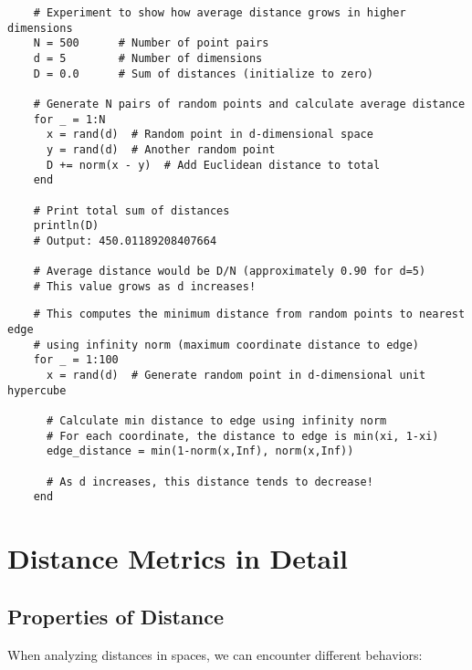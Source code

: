 \begin{tcolorbox}[width=\textwidth, left=-6mm, sharp corners, boxrule=0pt, title=\textbf{Experiment: Average distance in high dimensions}]
  \begin{verbatim}
    # Experiment to show how average distance grows in higher dimensions
    N = 500      # Number of point pairs
    d = 5        # Number of dimensions
    D = 0.0      # Sum of distances (initialize to zero)

    # Generate N pairs of random points and calculate average distance
    for _ = 1:N
      x = rand(d)  # Random point in d-dimensional space
      y = rand(d)  # Another random point
      D += norm(x - y)  # Add Euclidean distance to total
    end

    # Print total sum of distances
    println(D)
    # Output: 450.01189208407664

    # Average distance would be D/N (approximately 0.90 for d=5)
    # This value grows as d increases!
  \end{verbatim}
\end{tcolorbox}

\begin{tcolorbox}[width=\textwidth, left=-6mm, sharp corners, boxrule=0pt, title=\textbf{ Experiment: Distance to nearest edge}]
  \begin{verbatim}
    # This computes the minimum distance from random points to nearest edge
    # using infinity norm (maximum coordinate distance to edge)
    for _ = 1:100
      x = rand(d)  # Generate random point in d-dimensional unit hypercube

      # Calculate min distance to edge using infinity norm
      # For each coordinate, the distance to edge is min(xi, 1-xi)
      edge_distance = min(1-norm(x,Inf), norm(x,Inf))

      # As d increases, this distance tends to decrease!
    end
  \end{verbatim}
\end{tcolorbox}

\section{Distance Metrics in Detail}
\subsection{Properties of Distance}
When analyzing distances in spaces, we can encounter different behaviors:

